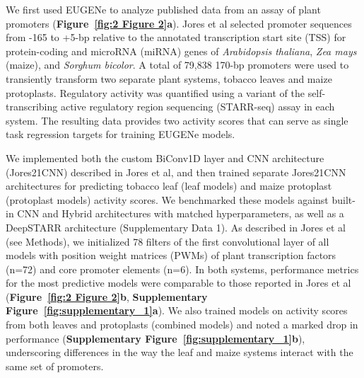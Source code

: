 We first used EUGENe to analyze published data from an assay of plant promoters\cite{Jores2021-iu} (\textbf{Figure~\ref{fig:2 Figure 2}a}). Jores et al selected promoter sequences from -165 to +5-bp relative to the annotated transcription start site (TSS) for protein-coding and microRNA (miRNA) genes of \textit{Arabidopsis thaliana}, \textit{Zea mays} (maize), and \textit{Sorghum bicolor}. A total of 79,838 170-bp promoters were used to transiently transform two separate plant systems, tobacco leaves and maize protoplasts. Regulatory activity was quantified using a variant of the self-transcribing active regulatory region sequencing (STARR-seq) assay\cite{Jores2020-hm} in each system. The resulting data provides two activity scores that can serve as single task regression targets for training EUGENe models.

We implemented both the custom BiConv1D layer\cite{Onimaru2020-do} and CNN architecture (Jores21CNN) described in Jores et al, and then trained separate Jores21CNN architectures for predicting tobacco leaf (leaf models) and maize protoplast (protoplast models) activity scores. We benchmarked these models against built-in CNN and Hybrid architectures with matched hyperparameters, as well as a DeepSTARR architecture\cite{De_Almeida2022-aa} (Supplementary Data 1). As described in Jores et al (see Methods), we initialized 78 filters of the first convolutional layer of all models with position weight matrices (PWMs) of plant transcription factors (n=72) and core promoter elements (n=6)\cite{Jores2021-iu}. In both systems, performance metrics for the most predictive models were comparable to those reported in Jores et al (\textbf{Figure~\ref{fig:2 Figure 2}b}, \textbf{Supplementary Figure~\ref{fig:supplementary_1}a}). We also trained models on activity scores from both leaves and protoplasts (combined models) and noted a marked drop in performance (\textbf{Supplementary Figure~\ref{fig:supplementary_1}b}), underscoring differences in the way the leaf and maize systems interact with the same set of promoters\cite{Jores2021-iu}.

